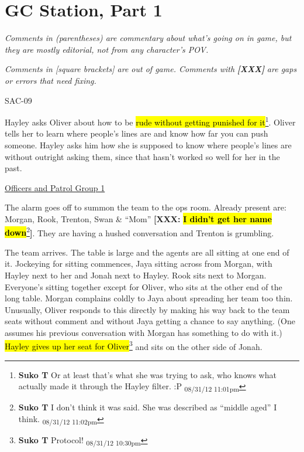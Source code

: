 \setcounter{chapter}{ 5 }
\chapter{GC Station, Part 1 }





\textit{Comments in (parentheses) are commentary about what's going on in game, but they are mostly editorial, not from any character's POV.}

\textit{Comments in {[}square brackets{]} are out of game.  Comments with}\textit{\textbf{ {[}XXX{]}}}\textit{ are gaps or errors that need fixing.}



\noindent\hrulefill





 {\LARGE SAC-09 } 



Hayley asks Oliver about how to be \hl{rude without getting punished for it}\footnote{\textbf{Suko T }Or at least that's what she was trying to ask, who knows what actually made it through the Hayley filter. :P \textsubscript{08/31/12 11:01pm}}. Oliver tells her to learn where people's lines are and know how far you can push someone.  Hayley asks him how she is supposed to know where people's lines are without outright asking them, since that hasn't worked so well for her in the past.


\underline{ Officers and Patrol Group 1 }

The alarm goes off to summon the team to the ops room.  Already present are: Morgan, Rook, Trenton, Swan \& ``Mom''\textbf{ {[}XXX: }\textbf{\hl{I didn't get her name down}}\footnote{\textbf{Suko T }I don't think it was said. She was described as ``middle aged'' I think. \textsubscript{08/31/12 11:02pm}}\textbf{{]}}.\textbf{  }They are having a hushed conversation and Trenton is grumbling.



The team arrives.  The table is large and the agents are all sitting at one end of it.  Jockeying for sitting commences, Jaya sitting across from Morgan, with Hayley next to her and Jonah next to Hayley.  Rook sits next to Morgan.  Everyone's sitting together except for Oliver, who sits at the other end of the long table.  Morgan complains coldly to Jaya about spreading her team too thin.  Unusually, Oliver responds to this directly by making his way back to the team seats without comment and without Jaya getting a chance to say anything.  (One assumes his previous conversation with Morgan has something to do with it.)  \hl{Hayley gives up her seat for Oliver}\footnote{\textbf{Suko T }Protocol! \textsubscript{08/31/12 10:30pm}} and sits on the other side of Jonah.



